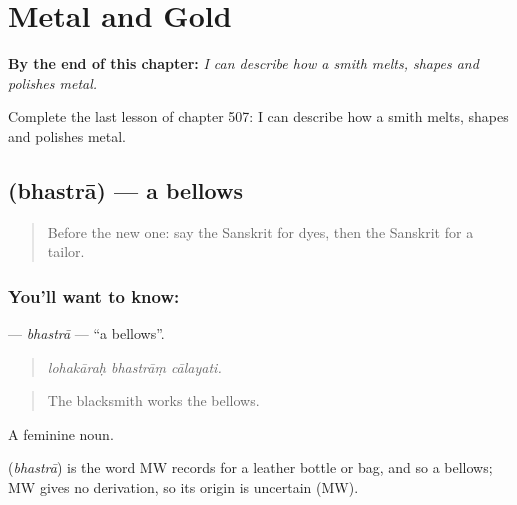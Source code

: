
\chapter{Metal and Gold}
\label{ch:sa-metal-and-gold}

\begin{chapteropening}
\textbf{By the end of this chapter:} \emph{I can describe how a smith melts, shapes and polishes metal.}

Complete the last lesson of chapter 507: I can describe how a smith melts, shapes and polishes metal.
\end{chapteropening}

\section[\texorpdfstring{\sk{भस्त्रा} (bhastrā)}{भस्त्रा (bhastrā)}]{ (bhastrā) — a bellows}

\label{lesson:SA-C507-bhastra}



\begin{quote}
Before the new one: say the Sanskrit for dyes, then the Sanskrit for a tailor.
\end{quote}

\subsection*{You'll want to know: }
\textbf{} — \emph{bhastrā} — \textquotedblleft{}a bellows\textquotedblright{}.

\begin{quote}
  
\end{quote}

\begin{quote}
\emph{lohakāraḥ bhastrāṃ cālayati.}
\end{quote}

\begin{quote}
The blacksmith works the bellows.
\end{quote}

A feminine noun.

\begin{cousinweb}
\textbf{} (\emph{bhastrā}) is the word MW records for a leather bottle or bag, and so a bellows; MW gives no derivation, so its origin is uncertain (MW).
\end{cousinweb}

